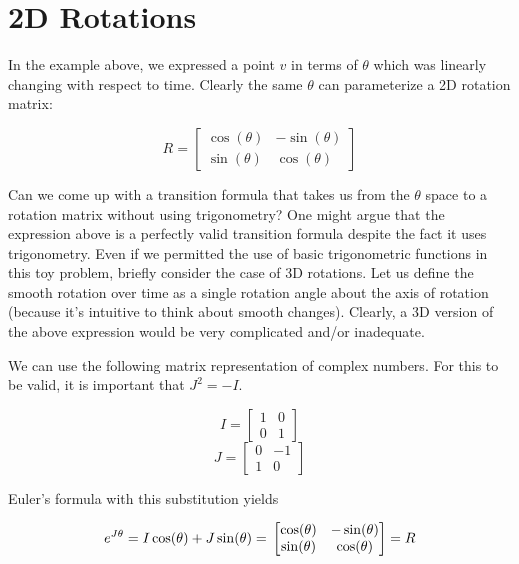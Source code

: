 \documentclass{article}
\begin{document}
\section{2D Rotations}
  In the example above, we expressed a point $v$ in terms of $\theta$ which was linearly changing with respect to time. Clearly the same $\theta$ can parameterize a 2D rotation matrix:

  \begin{equation}
    R = \left[\begin{matrix} \cos(\theta) & -\sin(\theta) \\
                             \sin(\theta) & \cos(\theta) \end{matrix}\right]
  \end{equation}

  Can we come up with a transition formula that takes us from the $\theta$ space to a rotation matrix without using trigonometry? One might argue that the expression above is a perfectly valid transition formula despite the fact it uses trigonometry. Even if we permitted the use of basic trigonometric functions in this toy problem, briefly consider the case of 3D rotations. Let us define the smooth rotation over time as a single rotation angle about the axis of rotation (because it's intuitive to think about smooth changes). Clearly, a 3D version of the above expression would be very complicated and/or inadequate.

  We can use the following matrix representation of complex numbers. For this to be valid, it is important that $J^2 = -I$.

  \begin{equation}
    I = \left[\begin{matrix} 1 & 0 \\
                             0 & 1 \end{matrix}\right]
  \end{equation}
  \begin{equation}
    J = \left[\begin{matrix} 0 & -1 \\
                             1 & 0  \end{matrix}\right]
  \end{equation}

  Euler's formula with this substitution yields

  \begin{equation}
    e^{J\theta} = I\cos(\theta) + J\sin(\theta) = \\
    \left[\begin{matrix} \cos(\theta) & -\sin(\theta) \\
                         \sin(\theta) & \cos(\theta) \end{matrix}\right] = \\
    R
  \end{equation}
\end{document}
